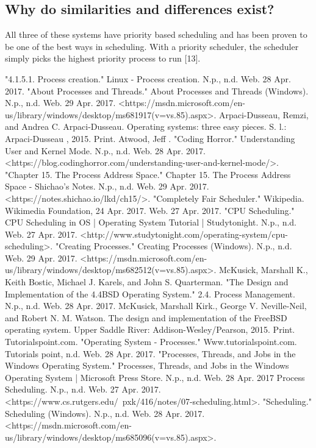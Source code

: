 \documentclass[letterpaper,10pt,titlepage]{article}
\begin{document}
\subsection{Why do similarities and differences exist?}

All three of these systems have priority based scheduling and has been proven to be one of the best ways in scheduling. With a priority scheduler, the scheduler simply picks the highest priority process to run [13]. \\

\begin{thebibliography}{7}
	"4.1.5.1. Process creation." Linux - Process creation. N.p., n.d. Web. 28 Apr. 2017.
	"About Processes and Threads." About Processes and Threads (Windows). N.p., n.d. Web. 29 Apr.
2017. <https://msdn.microsoft.com/en-us/library/windows/desktop/ms681917(v=vs.85).aspx>.
	Arpaci-Dusseau, Remzi, and Andrea C. Arpaci-Dusseau. Operating systems: three easy pieces. S. l.: Arpaci-Dusseau , 2015. Print.
	Atwood, Jeff . "Coding Horror." Understanding User and Kernel Mode. N.p., n.d. Web. 28 Apr. 2017. <https://blog.codinghorror.com/understanding-user-and-kernel-mode/>.
	"Chapter 15. The Process Address Space." Chapter 15. The Process Address Space - Shichao's Notes. N.p., n.d. Web. 29 Apr. 2017. <https://notes.shichao.io/lkd/ch15/>.
	"Completely Fair Scheduler." Wikipedia. Wikimedia Foundation, 24 Apr. 2017. Web. 27 Apr. 2017.
	"CPU Scheduling." CPU Scheduling in OS | Operating System Tutorial | Studytonight. N.p., n.d. Web. 27 Apr. 2017. <http://www.studytonight.com/operating-system/cpu-scheduling>.
	"Creating Processes." Creating Processes (Windows). N.p., n.d. Web. 29 Apr. 2017. <https://msdn.microsoft.com/en-us/library/windows/desktop/ms682512(v=vs.85).aspx>.
	McKusick, Marshall K., Keith Bostic, Michael J. Karels, and John S. Quarterman. "The Design and Implementation of the 4.4BSD Operating System." 2.4. Process Management. N.p., n.d. Web. 28 Apr. 2017.
	McKusick, Marshall Kirk., George V. Neville-Neil, and Robert N. M. Watson. The design and implementation of the FreeBSD operating system. Upper Saddle River: Addison-Wesley/Pearson, 2015. Print.
	Tutorialspoint.com. "Operating System - Processes." Www.tutorialspoint.com. Tutorials point, n.d. Web. 28 Apr. 2017.
	"Processes, Threads, and Jobs in the Windows Operating System." Processes, Threads, and Jobs in the Windows Operating System | Microsoft Press Store. N.p., n.d. Web. 28 Apr. 2017
	Process Scheduling. N.p., n.d. Web. 27 Apr. 2017. <https://www.cs.rutgers.edu/~pxk/416/notes/07-scheduling.html>.
	"Scheduling." Scheduling (Windows). N.p., n.d. Web. 28 Apr. 2017. <https://msdn.microsoft.com/en-us/library/windows/desktop/ms685096(v=vs.85).aspx>.

%
%
\end{thebibliography}
%
%
\end{document}
